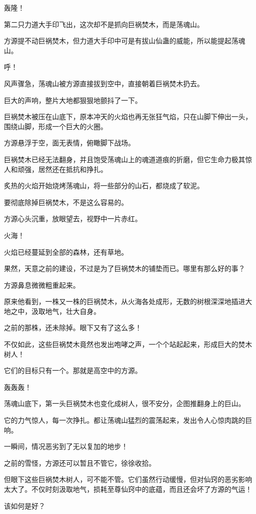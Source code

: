 \begin{this_body}
轰隆！

第二只力道大手印飞出，这次却不是抓向巨祸焚木，而是荡魂山。

方源提不动巨祸焚木，但力道大手印中可是有拔山仙蛊的威能，所以能提起荡魂山。

呼！

风声骤急，荡魂山被方源直接拔到空中，直接朝着巨祸焚木扔去。

巨大的声响，整片大地都狠狠地颤抖了一下。

巨祸焚木被压在山底下，原本冲天的火焰也再无张狂气焰，只在山脚下伸出一头，围绕山脚，形成一个巨大的火圈。

方源悬浮于空，面无表情，俯瞰脚下战场。

巨祸焚木已经无法翻身，并且饱受荡魂山上的魂道道痕的折磨，但它生命力极其惊人和顽强，居然还在抵抗和挣扎。

炙热的火焰开始烧烤荡魂山，将一些部分的山石，都烧成了软泥。

要彻底除掉巨祸焚木，不是这么容易的。

方源心头沉重，放眼望去，视野中一片赤红。

火海！

火焰已经蔓延到全部的森林，还有草地。

果然，天意之前的建设，不过是为了巨祸焚木的铺垫而已。哪里有那么好的事？

方源鼻息微微粗重起来。

原来他看到，一株又一株的巨祸焚木，从火海各处成形，无数的树根深深地插进大地之中，汲取地气，壮大自身。

之前的那株，还未除掉。眼下又有了这么多！

不仅如此，这些巨祸焚木竟然也发出咆哮之声，一个个站起起来，形成巨大的焚木树人！

它们的目标只有一个。那就是高空中的方源。

轰轰轰！

荡魂山底下，第一头巨祸焚木也变化成树人，很不安分，企图推翻身上的巨山。

它的力气惊人，每一次挣扎。都让荡魂山猛烈的震荡起来，发出令人心惊肉跳的巨响。

一瞬间，情况恶劣到了无以复加的地步！

之前的雪怪，方源还可以暂且不管它，徐徐收拾。

但眼下这些巨祸焚木树人，可不能不管。它们虽然行动缓慢，但对仙窍的恶劣影响太大了。不仅时刻汲取地气，损耗至尊仙窍中的底蕴，而且还会坏了方源的气运！

该如何是好？


\end{this_body}
